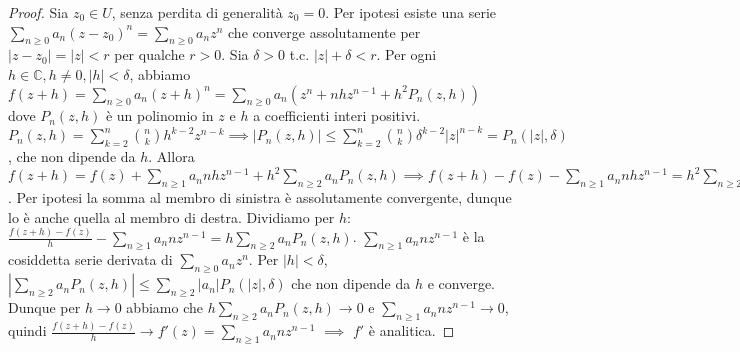 \begin{proof}
  Sia $z_0 \in U$, senza perdita di generalità $z_0=0$. Per ipotesi esiste una serie $\displaystyle \sum_{n \ge 0} a_n(z-z_0)^n=\sum_{n \ge 0} a_nz^n$ che converge assolutamente per $|z-z_0|=|z|<r$ per qualche $r>0$. Sia $\delta>0$ t.c. $|z|+\delta<r$.
  Per ogni $h \in \mathbb{C}, h\not=0, |h|<\delta$, abbiamo $\displaystyle f(z+h)=\sum_{n \ge 0} a_n(z+h)^n=\sum_{n \ge 0} a_n(z^n+nhz^{n-1}+h^2P_n(z, h))$ dove $P_n(z, h)$ è un polinomio in $z$ e $h$ a coefficienti interi positivi.
  $\displaystyle P_n(z, h)=\sum_{k=2}^n \binom{n}{k}h^{k-2}z^{n-k} \implies |P_n(z, h)| \le \sum_{k=2}^n \binom{n}{k} \delta^{k-2}|z|^{n-k}=P_n(|z|, \delta)$, che non dipende da $h$.
  Allora $\displaystyle f(z+h)=f(z)+\sum_{n \ge 1} a_nnhz^{n-1}+h^2\sum_{n \ge 2}a_nP_n(z, h) \implies f(z+h)-f(z)-\sum_{n \ge 1} a_nnhz^{n-1}=h^2\sum_{n \ge 2} a_nP_n(z, h)$. Per ipotesi la somma al membro di sinistra è assolutamente convergente, dunque lo è anche quella al membro di destra.
  Dividiamo per $h$: $\displaystyle \frac{f(z+h)-f(z)}{h}-\sum_{n \ge 1}a_nnz^{n-1}=h\sum_{n \ge 2} a_nP_n(z, h)$. $\displaystyle \sum_{n \ge 1}a_nnz^{n-1}$ è la cosiddetta serie derivata di $\displaystyle \sum_{n \ge 0}a_nz^n$.
  Per $|h|<\delta$, $\displaystyle \left|\sum_{n \ge 2} a_nP_n(z, h)\right| \le \sum_{n \ge 2} |a_n|P_n(|z|, \delta)$ che non dipende da $h$ e converge.
  Dunque per $h \longrightarrow 0$ abbiamo che $\displaystyle h\sum_{n \ge 2} a_nP_n(z, h) \longrightarrow 0$ e $\displaystyle \sum_{n \ge 1} a_nnz^{n-1} \longrightarrow 0$, quindi $\displaystyle \frac{f(z+h)-f(z)}{h} \longrightarrow f'(z)=\sum_{n \ge 1} a_nnz^{n-1}$ $\implies$ $f'$ è analitica.
\end{proof}
